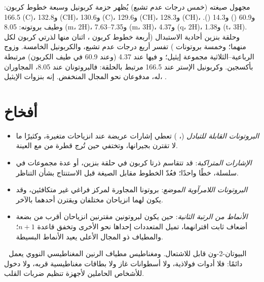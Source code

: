 \begin{example}\label{ex:b2:structure-determination:ester}
مجهول صيغته  (خمس درجات عدم تشبع) يُظهر حزمة كربونيل وسبعة
خطوط كربون: 166.5 (C)، و132.8 (CH)، و130.6 (C)، و129.6 (CH)، و128.3 (CH)، و60.9 () و14.3
(). وطيف بروتونه: 8.05 (m، 2H)، و7.35--7.63 (m، 3H)، و4.37 (q، 2H)، و1.38 (t، 3H). 
وحلقة بنزين أحادية الاستبدال (أربعة خطوط كربون ، اثنان منها لذرتي كربون لكل منهما؛ وخمسة
بروتونات ) تفسر أربع درجات عدم تشبع، والكربونيل الخامسة. وزوج الرباعية--الثلاثية
مجموعة إيثيل؛ و فيها عند 4.37 (وعند 60.9 في طيف الكربون) مرتبطة بأكسجين. وكربونيل الإستر
عند 166.5 مرتبط بالحلقة: فالبروتونان عند 8.05، المجاوران له، مدفوعان نحو المجال المنخفض. إنه بنزوات
الإيثيل، .
\end{example}

\section{أفخاخ}

\begin{itemize}
  \item \emph{البروتونات القابلة للتبادل} (، ) تعطي إشارات عريضة عند انزياحات متغيرة، 
        وكثيرًا ما لا تقترن بجيرانها، وتختفي حين تُرج قطرة من  مع
        العينة.
  \item \emph{الإشارات المتراكبة}: قد تتقاسم ذرتا كربون في حلقة بنزين، أو عدة مجموعات  في سلسلة،
        خطًا واحدًا؛ فعُدّ الخطوط مقابل الصيغة قبل الاستنتاج بشأن التناظر.
  \item \emph{البروتونات اللامرآوية الموضع}: بروتونا  المجاورة لمركز فراغي غير
        متكافئين، وقد يكون لهما انزياحان مختلفان ويقترن أحدهما بالآخر.
  \item \emph{الأنماط من الرتبة الثانية}: حين يكون لبروتونين مقترنين انزياحان أقرب من بضعة أضعاف
        ثابت اقترانهما، تميل المتعددات إحداها نحو الأخرى وتخفق قاعدة $n+1$؛ 
        والمطياف ذو المجال الأعلى يعيد الأنماط البسيطة.
\end{itemize}

\begin{safety}{\,\,}
البيوتان-2-ون قابل للاشتعال. ومغناطيس مطياف الرنين المغناطيسي النووي يعمل دائمًا: فلا أدوات فولاذية، ولا أسطوانات
غاز ولا بطاقات مغناطيسية قربه، ولا دخول للأشخاص الحاملين لأجهزة تنظيم ضربات القلب.
\end{safety}


